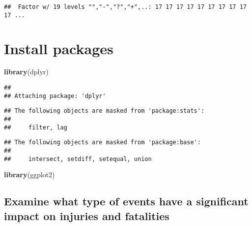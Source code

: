 \documentclass[]{article}
\newenvironment{Shaded}{\begin{snugshade}}{\end{snugshade}}
\newcommand{\KeywordTok}[1]{\textcolor[rgb]{0.13,0.29,0.53}{\textbf{#1}}}
\newcommand{\NormalTok}[1]{#1}
\newcommand{\OperatorTok}[1]{\textcolor[rgb]{0.81,0.36,0.00}{\textbf{#1}}}
\begin{document}
\begin{Shaded}
\end{Shaded}

\begin{verbatim}
##  Factor w/ 19 levels "","-","?","+",..: 17 17 17 17 17 17 17 17 17 17 ...
\end{verbatim}

\hypertarget{install-packages}{%
\section{Install packages}\label{install-packages}}

\begin{Shaded}
\begin{Highlighting}[]
\KeywordTok{library}\NormalTok{(dplyr)}
\end{Highlighting}
\end{Shaded}

\begin{verbatim}
## 
## Attaching package: 'dplyr'
\end{verbatim}

\begin{verbatim}
## The following objects are masked from 'package:stats':
## 
##     filter, lag
\end{verbatim}

\begin{verbatim}
## The following objects are masked from 'package:base':
## 
##     intersect, setdiff, setequal, union
\end{verbatim}

\begin{Shaded}
\begin{Highlighting}[]
\KeywordTok{library}\NormalTok{(ggplot2)}
\end{Highlighting}
\end{Shaded}

\hypertarget{examine-what-type-of-events-have-a-significant-impact-on-injuries-and-fatalities}{%
\subsection{Examine what type of events have a significant impact on
injuries and
fatalities}\label{examine-what-type-of-events-have-a-significant-impact-on-injuries-and-fatalities}}
\end{document}
